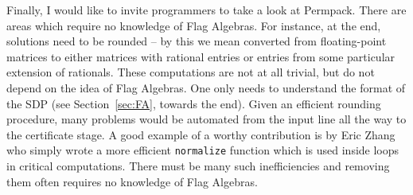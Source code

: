 \documentclass[12pt, a4paper, twoside]{report}
\begin{document}
Finally, I would like to invite programmers to take a look at Permpack. There are areas which require no knowledge of Flag Algebras. For instance, at the end, solutions need to be rounded -- by this we mean converted from floating-point matrices to either matrices with rational entries or entries from some particular extension of rationals. These computations are not at all trivial, but do not depend on the idea of Flag Algebras. One only needs to understand the format of the SDP (see Section~\ref{sec:FA}, towards the end). Given an efficient rounding procedure, many problems would be automated from the input line all the way to the certificate stage. A good example of a worthy contribution is by Eric Zhang who simply wrote a more efficient \texttt{normalize} function which is used inside loops in critical computations. There must be many such inefficiencies and removing them often requires no knowledge of Flag Algebras. 








{}

 
\end{document}
